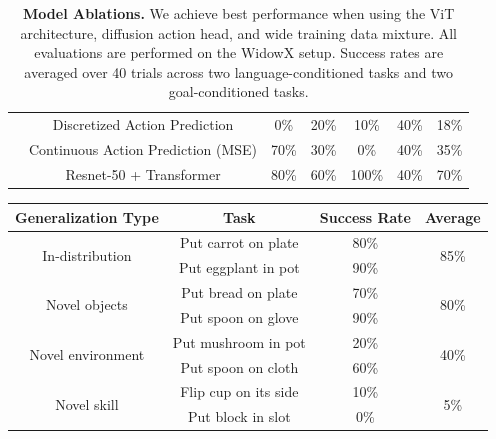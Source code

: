 \begin{appendices}
\begin{table}
{\begin{tabular}{ccccccc}
\parbox[t]{2mm}{}& Discretized Action Prediction \vspace{0.13cm} \citep{open_x_embodiment_rt_x_2023} & 0\% & 20\% & 10\% & 40\% & 18\% \\
& Continuous Action Prediction (MSE) \vspace{0.13cm} & 70\% & 30\% & 0\% & 40\% & 35\% \\
\midrule

\parbox[t]{2mm}{}& \vspace{0.4cm} Resnet-50 + Transformer \citep{open_x_embodiment_rt_x_2023} & 80\% & 60\% & 100\% & 40\% & 70\% \\
\bottomrule
\end{tabular}}

\caption{\textbf{Model Ablations.} We achieve best performance when using the ViT architecture, diffusion action head, and wide training data mixture. All evaluations are performed on the WidowX setup. Success rates are averaged over 40 trials across two language-conditioned tasks and two goal-conditioned tasks.}
\label{tab:ablations-breakdown}
\end{table}


\begin{table}
\centering
{
\begin{tabular}{cccc}
\toprule

Generalization Type & Task & Success Rate & Average  \\
\midrule

\multirow{2}{*}{In-distribution} & Put carrot on plate & 80\% & \multirow{2}{*}{85\%}\\
& Put eggplant in pot & 90\% \\
\midrule

\multirow{2}{*}{Novel objects} & Put bread on plate & 70\% & \multirow{2}{*}{80\%} \\
& Put spoon on glove & 90\% \\
\midrule

\multirow{2}{*}{Novel environment} & Put mushroom in pot & 20\% & \multirow{2}{*}{40\%} \\
& Put spoon on cloth & 60\% \\
\midrule

\multirow{2}{*}{Novel skill} & Flip cup on its side & 10\% & \multirow{2}{*}{5\%} \\
& Put block in slot & 0\%\\
\bottomrule


\end{tabular}}
\end{table}
\end{appendices}
